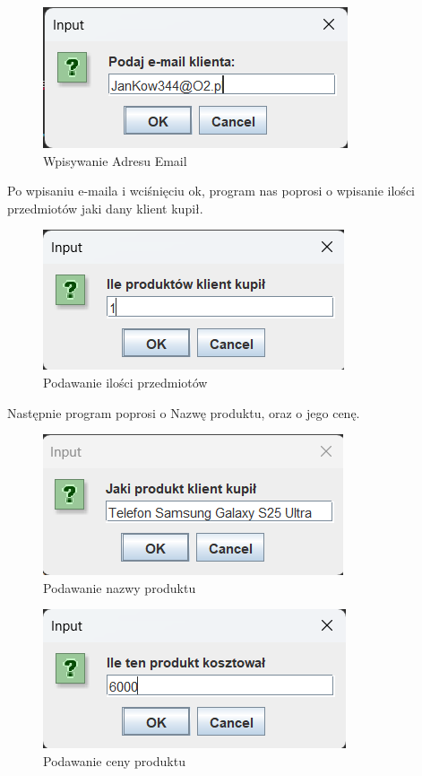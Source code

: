 \begin{figure}[H]
	\centering
	\includegraphics[width=0.7\linewidth]{figures/screenshot003}
	\caption{Wpisywanie Adresu Email}
	\label{fig:screenshot003}
\end{figure}
Po wpisaniu e-maila i wciśnięciu ok, program nas poprosi o wpisanie ilości przedmiotów jaki dany
klient kupił.
\begin{figure}[H]
	\centering
	\includegraphics[width=0.7\linewidth]{figures/screenshot004}
	\caption{Podawanie ilości przedmiotów}
	\label{fig:screenshot004}
\end{figure}
Następnie program poprosi o Nazwę produktu, oraz o jego cenę.
\begin{figure}[H]
	\centering
	\includegraphics[width=0.7\linewidth]{figures/screenshot005}
	\caption{Podawanie nazwy produktu}
	\label{fig:screenshot005}
\end{figure}
\begin{figure}[H]
	\centering
	\includegraphics[width=0.7\linewidth]{figures/screenshot006}
	\caption{Podawanie ceny produktu}
	\label{fig:screenshot006}
\end{figure}
